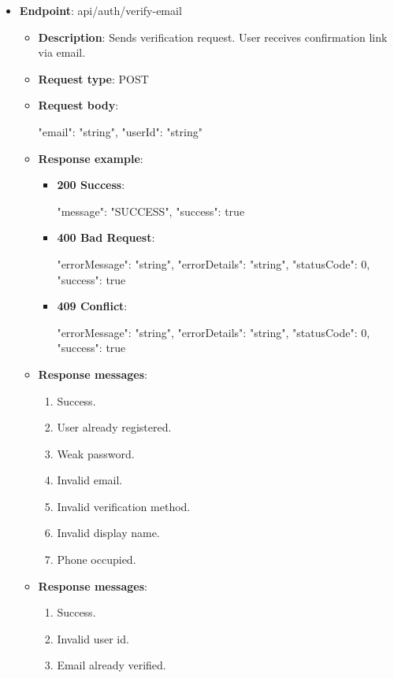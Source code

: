 \begin{itemize}
    \item \textbf{Endpoint}: api/auth/verify-email
    \begin{itemize}
        \item \textbf{Description}: Sends verification request.
        User receives confirmation link via email.
        \item \textbf{Request type}: POST
        \item \textbf{Request body}:
        \begin{spverbatim}
        {
            "email": "string",
            "userId": "string"
        }
        \end{spverbatim}
        \item  \textbf{Response example}:
        \begin{itemize}
            \item \textbf{200 Success}:
            \begin{spverbatim}
            {
                "message": "SUCCESS",
                "success": true
            }
            \end{spverbatim}
            \item \textbf{400 Bad Request}:
            \begin{spverbatim}
            {
                "errorMessage": "string",
                "errorDetails": "string",
                "statusCode": 0,
                "success": true
            }
            \end{spverbatim}
            \item \textbf{409 Conflict}:
            \begin{spverbatim}
            {
                "errorMessage": "string",
                "errorDetails": "string",
                "statusCode": 0,
                "success": true
            }
            \end{spverbatim}
        \end{itemize}
        \item \textbf{Response messages}:
        \begin{enumerate}
            \item Success.
            \item User already registered.
            \item Weak password.
            \item Invalid email.
            \item Invalid verification method.
            \item Invalid display name.
            \item Phone occupied.
        \end{enumerate}
        \item \textbf{Response messages}:
        \begin{enumerate}
            \item Success.
            \item Invalid user id.
            \item Email already verified.
        \end{enumerate}
    \end{itemize}


\end{itemize}
